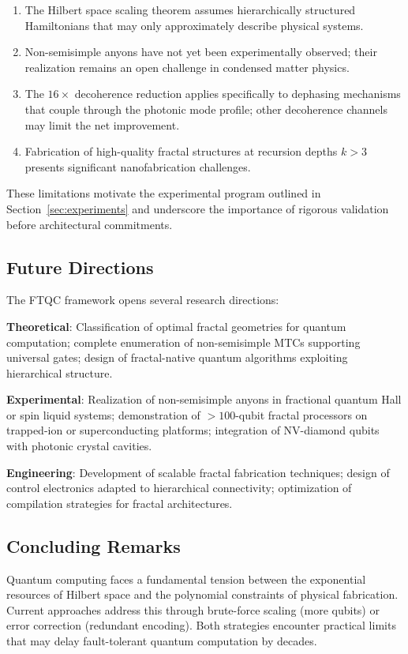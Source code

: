 \begin{enumerate}
\item The Hilbert space scaling theorem assumes hierarchically structured Hamiltonians that may only approximately describe physical systems.
\item Non-semisimple anyons have not yet been experimentally observed; their realization remains an open challenge in condensed matter physics.
\item The $16\times$ decoherence reduction applies specifically to dephasing mechanisms that couple through the photonic mode profile; other decoherence channels may limit the net improvement.
\item Fabrication of high-quality fractal structures at recursion depths $k > 3$ presents significant nanofabrication challenges.
\end{enumerate}

These limitations motivate the experimental program outlined in Section~\ref{sec:experiments} and underscore the importance of rigorous validation before architectural commitments.

\subsection{Future Directions}

The FTQC framework opens several research directions:

\textbf{Theoretical}: Classification of optimal fractal geometries for quantum computation; complete enumeration of non-semisimple MTCs supporting universal gates; design of fractal-native quantum algorithms exploiting hierarchical structure.

\textbf{Experimental}: Realization of non-semisimple anyons in fractional quantum Hall or spin liquid systems; demonstration of $> 100$-qubit fractal processors on trapped-ion or superconducting platforms; integration of NV-diamond qubits with photonic crystal cavities.

\textbf{Engineering}: Development of scalable fractal fabrication techniques; design of control electronics adapted to hierarchical connectivity; optimization of compilation strategies for fractal architectures.

\subsection{Concluding Remarks}

Quantum computing faces a fundamental tension between the exponential resources of Hilbert space and the polynomial constraints of physical fabrication. Current approaches address this through brute-force scaling (more qubits) or error correction (redundant encoding). Both strategies encounter practical limits that may delay fault-tolerant quantum computation by decades.

